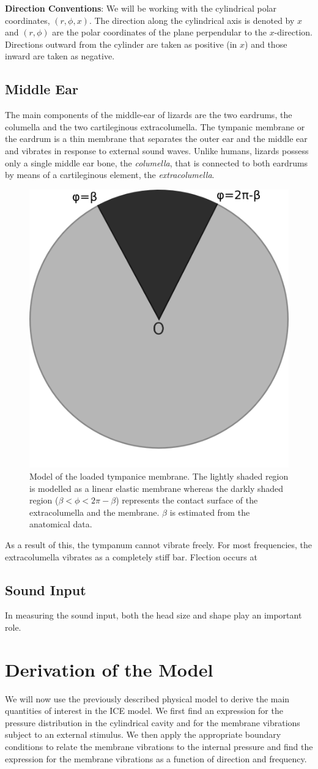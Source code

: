 \vspace{\baselineskip}
\noindent\textbf{Direction Conventions}: We will be working with the cylindrical polar coordinates, $(r,\phi,x)$. The direction
along the cylindrical axis is denoted by $x$ and $(r,\phi)$ are the polar coordinates of the plane perpendular to the $x$-direction. 
Directions outward from the cylinder are taken as positive (in $x$) and those inward are taken as negative.
\subsection{Middle Ear}\label{middleear}
The main components of the middle-ear of lizards are the two eardrums, the columella and the two cartileginous extracolumella.  
The tympanic membrane or the eardrum is a thin membrane that separates the outer ear and the
middle ear and vibrates in response to external sound waves.  Unlike humans, lizards 
possess only a single middle ear bone, the \textit{columella},
that is connected to both eardrums by means of a cartileginous element, the \textit{extracolumella}.
\begin{figure}[ht]
 \centering
 \includegraphics[width=.3\linewidth]{Diagrams/extracolumella2.png}
 \caption[Tympanic membrane model]{Model of the loaded tympanice membrane. The lightly shaded region is modelled as a linear elastic membrane whereas the darkly shaded region 
 ($\beta<\phi<2\pi-\beta$) represents the contact surface of the extracolumella and the membrane. $\beta$ is estimated from the anatomical data.}
\end{figure}
As a result of this, the tympanum cannot vibrate freely. For most frequencies, the extracolumella vibrates as a completely stiff
bar. Flection occurs at 
\subsection{Sound Input}
In measuring the sound input, both the head size and shape play an important role.

\section{Derivation of the Model}
We will now use the previously described physical model to derive the main quantities of interest in the ICE model. We first find an expression
for the pressure distribution in the cylindrical cavity and for the membrane vibrations subject to an external stimulus. We then apply the 
appropriate boundary conditions to relate the membrane vibrations to the internal pressure and find the expression for the membrane
vibrations as a function of direction and frequency.
